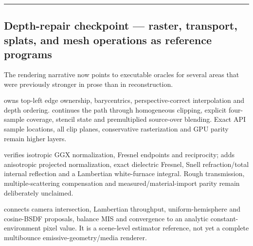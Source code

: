 \begin{center}\rule{0.5\linewidth}{0.5pt}\end{center}

\subsection{Depth-repair checkpoint --- raster, transport, splats, and mesh operations as reference programs}\label{04-visual-computing-ii-ch043-depth-repair-checkpoint-raster-transport-splats-and-mesh-operations-as-reference-programs}

\hypertarget{04-visual-computing-ii-ch043-depth-repair-checkpoint-raster-transport-splats-and-mesh-operations-as-reference-programs}{}

The rendering narrative now points to executable oracles for several areas that were previously stronger in prose than in reconstruction.

 owns top-left edge ownership, barycentrics, perspective-correct interpolation and depth ordering.  continues the path through homogeneous clipping, explicit four-sample coverage, stencil state and premultiplied source-over blending. Exact API sample locations, all clip planes, conservative rasterization and GPU parity remain higher layers.

 verifies isotropic GGX normalization, Fresnel endpoints and reciprocity;  adds anisotropic projected normalization, exact dielectric Fresnel, Snell refraction/total internal reflection and a Lambertian white-furnace integral. Rough transmission, multiple-scattering compensation and measured/material-import parity remain deliberately unclaimed.

 connects camera intersection, Lambertian throughput, uniform-hemisphere and cosine-BSDF proposals, balance MIS and convergence to an analytic constant-environment pixel value. It is a scene-level estimator reference, not yet a complete multibounce emissive-geometry/media renderer.

